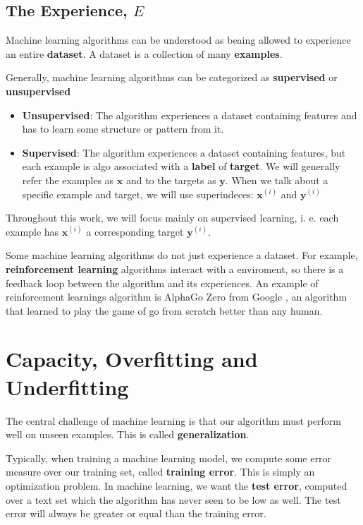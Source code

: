 \subsection{The Experience, \(E\)}
Machine learning algorithms can be understood as beaing allowed to experience an entire \textbf{dataset}. A dataset is a collection of many \textbf{examples}.

Generally, machine learning algorithms can be categorized as \textbf{supervised} or \textbf{unsupervised}
\begin{itemize}
\item \textbf{Unsupervised}: The algorithm experiences a dataset containing features and has to learn some structure or pattern from it.
\item \textbf{Supervised}: The algorithm experiences a dataset containing features, but each example is algo associated with a \textbf{label} of \textbf{target}. We will generally refer the examples as \(\bm{x}\) and to the targets as \(\bm{y}\). When we talk about a specific example and target, we will use superindeces: \(\bm{x}^{(i)}\) and \(\bm{y}^{(i)}\)

\end{itemize}
Throughout this work, we will focus mainly on supervised learning, i. e. each example has \(\bm{x}^{(i)}\) a corresponding target \(\bm{y}^{(i)}\).

Some machine learning algorithms do not just experience a dataset. For example, \textbf{reinforcement learning} algorithms interact with a enviroment, so there is a feedback loop between the algorithm and its experiences. An example of reinforcement learnings algorithm is AlphaGo Zero from Google \parencite{alphago}, an algorithm that learned to play the game of go from scratch better than any human. 



\section{Capacity, Overfitting and Underfitting}

The central challenge of machine learning is that our algorithm must perform well on unseen examples. This is called \textbf{generalization}.

Typically, when training a machine learning model, we compute some error measure over our training set, called \textbf{training error}. This is simply an optimization problem. In machine learning, we want the \textbf{test error}, computed over a text set which the algorithm has never seen to be low as well. The test error will always be greater or equal than the training error.

